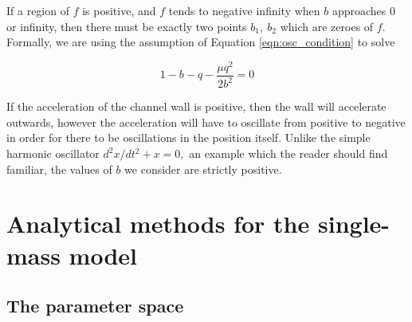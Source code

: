 \documentclass{article}
\begin{document}
If a region of $f$ is positive, and $f$ tends to negative infinity when $b$ approaches $0$ or infinity,
then there must be exactly two points $b_1,~b_2$ which are zeroes of $f$.
Formally, we are using the assumption of Equation \ref{eqn:osc_condition} to solve

\begin{equation}
    1 - b - q - \frac{\mu q^2}{2b^2} = 0
\end{equation}


If the acceleration of the channel wall is positive, then the wall will accelerate outwards,
however the acceleration will have to oscillate from positive to negative in order for there to be oscillations in the position itself.
Unlike the simple harmonic oscillator $d^2 x/dt^2 + x = 0,$ an example which the reader should find familiar, the values of $b$ we consider are strictly positive.

\section{Analytical methods for the single-mass model}



\subsection{The parameter space}
\end{document}
